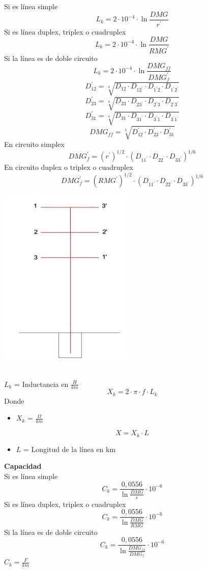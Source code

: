 \documentclass[10pt,a4paper]{article}
\begin{document}
Si es línea simple
$$
L_k=2 \cdot 10^{-4} \cdot \ln \frac{D M G}{r^{\prime}}
$$
Si es línea duplex, triplex o cuadruplex
$$
L_k=2 \cdot 10^{-4} \cdot \ln \frac{D M G}{R M G^{\prime}}
$$
Si la línea es de doble circuito
$$
L_k=2 \cdot 10^{-4} \cdot \ln \frac{D M G_{f f}}{D M G_{f}^{\prime}}
$$
$$
D_{12}^{\prime}=\sqrt[4]{D_{12} \cdot D_{12^{\prime}} \cdot D_{1^{\prime} 2} \cdot D_{1^{\prime }2^{\prime }}} 
$$
$$
D_{23}^{\prime}=\sqrt[4]{D_{23} \cdot D_{23^{\prime}} \cdot D_{2^{\prime} 3} \cdot D_{2^{\prime} 3^{\prime}}} 
$$
$$
D_{31}^{\prime}=\sqrt[4]{D_{31} \cdot D_{31^{\prime}} \cdot D_{3^{\prime} 1} \cdot D_{3^{\prime}1^{\prime }}}
$$
$$
D M G_{f f}=\sqrt[3]{D_{12}^{\prime} \cdot D_{23}^{\prime} \cdot D_{31}^{\prime}}
$$
En circuito simplex
$$
D M G_{f}^{\prime}=\left(r^{\prime}\right)^{1 / 2} \cdot\left(D_{11^{\prime}} \cdot D_{22^{\prime}} \cdot D_{33^{\prime}}\right)^{1 / 6}
$$
En circuito duplex o triplex o cuadruplex
$$
D M G_{f}^{\prime}=\left(R M G^{\prime}\right)^{1 / 2} \cdot\left(D_{11^{\prime}} \cdot D_{22^{\prime}} \cdot D_{33^{\prime}}\right)^{1 / 6}
$$
\begin{center}
\includegraphics[scale = 0.7]{src/10.jpg}    
\end{center}

\\

$L_k$ = Inductancia en $\frac{H}{km}$
$$
X_k = 2 \cdot \pi \cdot f \cdot L_k 
$$
Donde
\begin{itemize}
    \item $X_k$ = $\frac{\Omega}{km}$
\end{itemize}
$$
X = X_k \cdot L
$$
\begin{itemize}
    \item $L$ = Longitud de la línea en km
\end{itemize}
\newpage
\textbf{Capacidad}
\\
Si es línea simple
$$
C_k=\frac{0,0556}{\ln \frac{D M G}{r}} \cdot 10^{-6}
$$
Si es línea duplex, triplex o cuadruplex
$$
C_k=\frac{0,0556}{\ln \frac{D M G}{R M G}} \cdot 10^{-6}
$$
Si la línea es de doble circuito
$$
C_k=\frac{0,0556}{\ln \frac{D M G_{ff}}{D M G _f}} \cdot 10^{-6}
$$
$C_k = \frac{F}{km}$
\\
\end{document}
